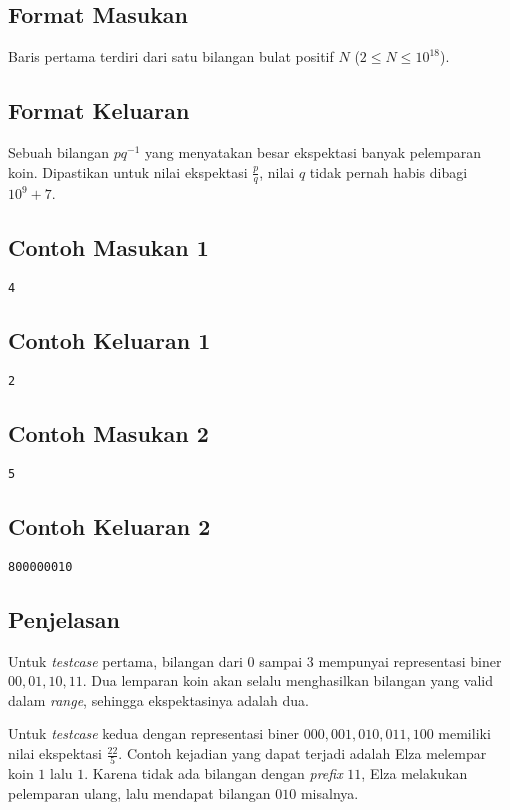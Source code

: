 \documentclass{article}
\begin{document}
\subsection*{Format Masukan}
Baris pertama terdiri dari satu bilangan bulat positif $N$ ($2 \leq N \leq 10^{18}$).

\subsection*{Format Keluaran}
Sebuah bilangan $pq^{-1}$ yang menyatakan besar ekspektasi banyak pelemparan koin. Dipastikan untuk nilai ekspektasi $\frac{p}{q}$, nilai $q$ tidak pernah habis dibagi $10^9+7$.


\begin{multicols}{2}
\subsection*{Contoh Masukan 1}
\begin{lstlisting}
4
\end{lstlisting}
\columnbreak
\subsection*{Contoh Keluaran 1}
\begin{lstlisting}
2
\end{lstlisting}
\end{multicols}

\begin{multicols}{2}
\subsection*{Contoh Masukan 2}
\begin{lstlisting}
5
\end{lstlisting}
\columnbreak
\subsection*{Contoh Keluaran 2}
\begin{lstlisting}
800000010
\end{lstlisting}
\end{multicols}

\subsection*{Penjelasan}
Untuk \textit{testcase} pertama, bilangan dari $0$ sampai $3$ mempunyai representasi biner $00, 01, 10, 11$. Dua lemparan koin akan selalu menghasilkan bilangan yang valid dalam \textit{range}, sehingga ekspektasinya adalah dua.

Untuk \textit{testcase} kedua dengan representasi biner $000, 001, 010, 011, 100$ memiliki nilai ekspektasi $\frac{22}{5}$. Contoh kejadian yang dapat terjadi adalah Elza melempar koin $1$ lalu $1$. Karena tidak ada bilangan dengan \textit{prefix} $11$, Elza melakukan pelemparan ulang, lalu mendapat bilangan $010$ misalnya. 
\pagebreak
\end{document}
